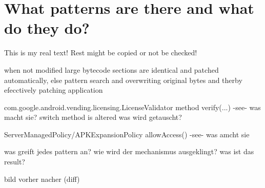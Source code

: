 \section{What patterns are there and what do they do?} \label{section:luckypatcher-patterns}
This is my real text! Rest might be copied or not be checked!

%
when  not modified large bytecode sections are identical and patched automatically, else pattern search and overwriting original bytes and therby efecctively patching application



com.google.android.vending.licensing.LicenseValidator
method verify(...) -see- was macht sie?
switch method is altered
was wird getauscht?


ServerManagedPolicy/APKExpansionPolicy
allowAccess() -see- was amcht sie



\cite{munteanLicense}
%



was greift jedes pattern an? wie wird der mechanismus ausgeklingt? was ist das result?

bild vorher nacher (diff)
